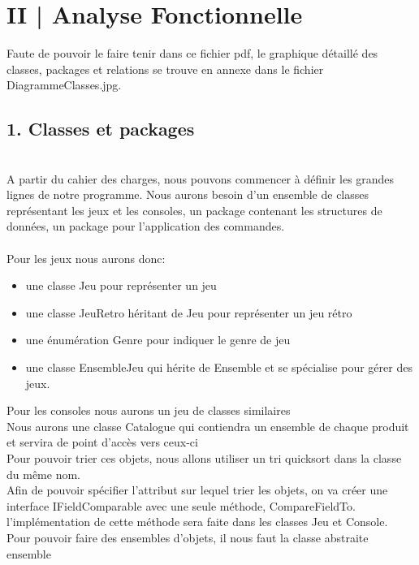 \documentclass[11pt]{article}
\begin{document}
\newpage{}
\fancyhf{}

    \section*{II | Analyse Fonctionnelle}
    Faute de pouvoir le faire tenir dans ce fichier pdf, le graphique détaillé des classes, packages et relations se trouve en annexe dans le fichier DiagrammeClasses.jpg. 
    
    \subsection*{1. Classes et packages}
    \\
    A partir du cahier des charges, nous pouvons commencer à définir les grandes lignes de notre programme.
    Nous aurons besoin d'un ensemble de classes représentant les jeux et les consoles, un package contenant les structures de données, un package pour l'application des commandes.
    \\\\
    Pour les jeux nous aurons donc: 
    \begin{itemize}
        \item une classe Jeu pour représenter un jeu
        \item une classe JeuRetro héritant de Jeu pour représenter un jeu rétro 
        \item une énumération Genre pour indiquer le genre de jeu
        \item une classe EnsembleJeu qui hérite de Ensemble et se spécialise pour gérer des jeux.
    \end{itemize}
    \vspace{\baselineskip}
    Pour les consoles nous aurons un jeu de classes similaires
    \\
    Nous aurons une classe Catalogue qui contiendra un ensemble de chaque produit et servira de point d'accès vers ceux-ci
    \\
    Pour pouvoir trier ces objets, nous allons utiliser un tri quicksort dans la classe du même nom. 
    \\
    Afin de pouvoir spécifier l'attribut sur lequel trier les objets, on va créer une interface IFieldComparable avec une seule méthode, CompareFieldTo. l'implémentation de cette méthode sera faite dans les classes Jeu et Console.
    \\
    Pour pouvoir faire des ensembles d'objets, il nous faut la classe abstraite ensemble
\end{document}

